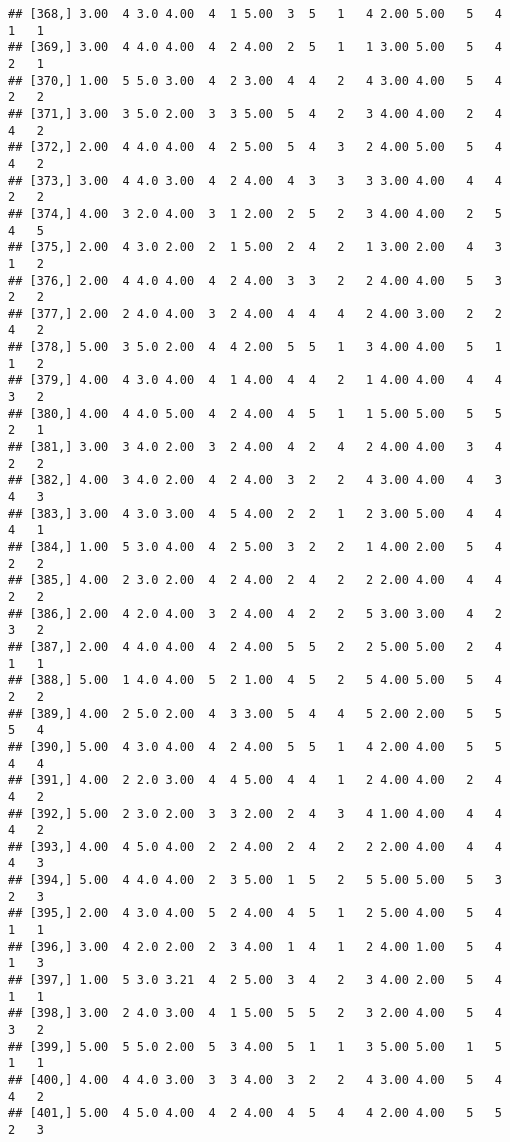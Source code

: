 \documentclass[]{article}
\begin{document}
\begin{verbatim}
## [368,] 3.00  4 3.0 4.00  4  1 5.00  3  5   1   4 2.00 5.00   5   4   1   1
## [369,] 3.00  4 4.0 4.00  4  2 4.00  2  5   1   1 3.00 5.00   5   4   2   1
## [370,] 1.00  5 5.0 3.00  4  2 3.00  4  4   2   4 3.00 4.00   5   4   2   2
## [371,] 3.00  3 5.0 2.00  3  3 5.00  5  4   2   3 4.00 4.00   2   4   4   2
## [372,] 2.00  4 4.0 4.00  4  2 5.00  5  4   3   2 4.00 5.00   5   4   4   2
## [373,] 3.00  4 4.0 3.00  4  2 4.00  4  3   3   3 3.00 4.00   4   4   2   2
## [374,] 4.00  3 2.0 4.00  3  1 2.00  2  5   2   3 4.00 4.00   2   5   4   5
## [375,] 2.00  4 3.0 2.00  2  1 5.00  2  4   2   1 3.00 2.00   4   3   1   2
## [376,] 2.00  4 4.0 4.00  4  2 4.00  3  3   2   2 4.00 4.00   5   3   2   2
## [377,] 2.00  2 4.0 4.00  3  2 4.00  4  4   4   2 4.00 3.00   2   2   4   2
## [378,] 5.00  3 5.0 2.00  4  4 2.00  5  5   1   3 4.00 4.00   5   1   1   2
## [379,] 4.00  4 3.0 4.00  4  1 4.00  4  4   2   1 4.00 4.00   4   4   3   2
## [380,] 4.00  4 4.0 5.00  4  2 4.00  4  5   1   1 5.00 5.00   5   5   2   1
## [381,] 3.00  3 4.0 2.00  3  2 4.00  4  2   4   2 4.00 4.00   3   4   2   2
## [382,] 4.00  3 4.0 2.00  4  2 4.00  3  2   2   4 3.00 4.00   4   3   4   3
## [383,] 3.00  4 3.0 3.00  4  5 4.00  2  2   1   2 3.00 5.00   4   4   4   1
## [384,] 1.00  5 3.0 4.00  4  2 5.00  3  2   2   1 4.00 2.00   5   4   2   2
## [385,] 4.00  2 3.0 2.00  4  2 4.00  2  4   2   2 2.00 4.00   4   4   2   2
## [386,] 2.00  4 2.0 4.00  3  2 4.00  4  2   2   5 3.00 3.00   4   2   3   2
## [387,] 2.00  4 4.0 4.00  4  2 4.00  5  5   2   2 5.00 5.00   2   4   1   1
## [388,] 5.00  1 4.0 4.00  5  2 1.00  4  5   2   5 4.00 5.00   5   4   2   2
## [389,] 4.00  2 5.0 2.00  4  3 3.00  5  4   4   5 2.00 2.00   5   5   5   4
## [390,] 5.00  4 3.0 4.00  4  2 4.00  5  5   1   4 2.00 4.00   5   5   4   4
## [391,] 4.00  2 2.0 3.00  4  4 5.00  4  4   1   2 4.00 4.00   2   4   4   2
## [392,] 5.00  2 3.0 2.00  3  3 2.00  2  4   3   4 1.00 4.00   4   4   4   2
## [393,] 4.00  4 5.0 4.00  2  2 4.00  2  4   2   2 2.00 4.00   4   4   4   3
## [394,] 5.00  4 4.0 4.00  2  3 5.00  1  5   2   5 5.00 5.00   5   3   2   3
## [395,] 2.00  4 3.0 4.00  5  2 4.00  4  5   1   2 5.00 4.00   5   4   1   1
## [396,] 3.00  4 2.0 2.00  2  3 4.00  1  4   1   2 4.00 1.00   5   4   1   3
## [397,] 1.00  5 3.0 3.21  4  2 5.00  3  4   2   3 4.00 2.00   5   4   1   1
## [398,] 3.00  2 4.0 3.00  4  1 5.00  5  5   2   3 2.00 4.00   5   4   3   2
## [399,] 5.00  5 5.0 2.00  5  3 4.00  5  1   1   3 5.00 5.00   1   5   1   1
## [400,] 4.00  4 4.0 3.00  3  3 4.00  3  2   2   4 3.00 4.00   5   4   4   2
## [401,] 5.00  4 5.0 4.00  4  2 4.00  4  5   4   4 2.00 4.00   5   5   2   3

\end{verbatim}
\end{document}
